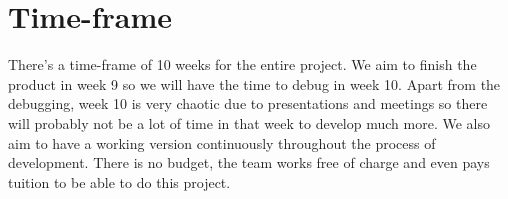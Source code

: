 \documentclass[a4paper]{article}
\begin{document}
\section{Time-frame}
There's a time-frame of 10 weeks for the entire project. We aim to finish the product in week 9 so we will have the time to debug in week 10. Apart from the debugging, week 10 is very chaotic due to presentations and meetings so there will probably not be a lot of time in that week to develop much more. We also aim to have a working version continuously throughout the process of development. There is no budget, the team works free of charge and even pays tuition to be able to do this project.
\cite{anderson}


\end{document}
